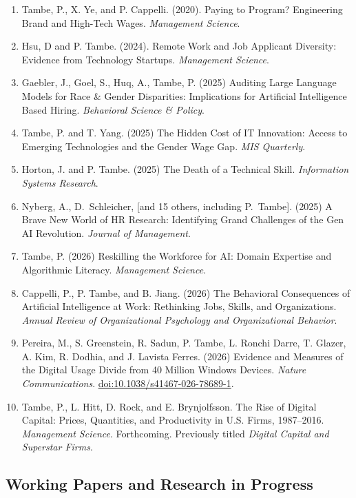 \documentclass[10pt,letterpaper]{article}
\begin{document}
\begin{enumerate}
  Forward. \textit{California Management Review}.
\item Tambe, P., X. Ye, and P. Cappelli. (2020).
  Paying to Program? Engineering Brand and High-Tech Wages.
  \textit{Management Science}.
\item Hsu, D and P. Tambe. (2024). 
  Remote Work and Job Applicant Diversity: Evidence from Technology Startups.
  \emph{Management Science}.
\item Gaebler, J., Goel, S., Huq, A., Tambe, P. (2025)
  Auditing Large Language Models for Race \& Gender Disparities: Implications for Artificial Intelligence Based Hiring. \emph{Behavioral Science \& Policy}.
\item Tambe, P. and T. Yang. (2025)
  The Hidden Cost of IT Innovation: Access to Emerging Technologies and the Gender Wage Gap. \emph{MIS Quarterly}.
  \item Horton, J. and P. Tambe. (2025)
  The Death of a Technical Skill. \emph{Information Systems Research}.
  \item Nyberg, A., D.~Schleicher, [and 15 others, including P.~Tambe]. (2025)
  A Brave New World of HR Research: Identifying Grand Challenges of the Gen AI Revolution. \emph{Journal of Management}.
  \item Tambe, P. (2026)
  Reskilling the Workforce for AI: Domain Expertise and Algorithmic Literacy. \emph{Management Science}.
  \item Cappelli, P., P. Tambe, and B. Jiang. (2026)
  The Behavioral Consequences of Artificial Intelligence at Work: Rethinking Jobs, Skills, and Organizations. \emph{Annual Review of Organizational Psychology and Organizational Behavior}.
  \item Pereira, M., S. Greenstein, R. Sadun, P. Tambe, L. Ronchi Darre, T. Glazer, A. Kim, R. Dodhia, and J. Lavista Ferres. (2026)
  Evidence and Measures of the Digital Usage Divide from 40 Million Windows Devices. \emph{Nature Communications}. \href{https://doi.org/10.1038/s41467-026-78689-1}{doi:10.1038/s41467-026-78689-1}.
  \item Tambe, P., L. Hitt, D. Rock, and E. Brynjolfsson.
  The Rise of Digital Capital: Prices, Quantities, and Productivity in U.S. Firms, 1987--2016. \emph{Management Science}. Forthcoming. Previously titled \emph{Digital Capital and Superstar Firms}.
\end{enumerate}

\subsection*{Working Papers and Research in Progress}
\end{document}
